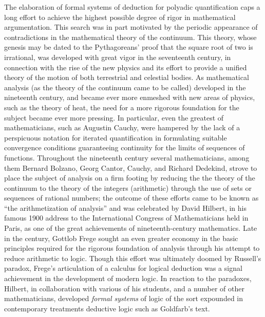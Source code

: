 The elaboration of formal systems of deduction for polyadic quantification caps a long effort to achieve the highest possible degree of rigor in mathematical argumentation. This search was in part motivated by the periodic appearance of contradictions in the mathematical theory of the continuum. This theory, whose genesis may be dated to the Pythagoreans' proof that the square root of two is irrational, was developed with great vigor in the seventeenth century, in connection with the rise of the new physics and its effort to provide a unified theory of the motion of both terrestrial and celestial bodies. As mathematical analysis (as the theory of the continuum came to be called) developed in the nineteenth century, and became ever more enmeshed with new areas of physics, such as the theory of heat, the need for a more rigorous foundation for the subject became ever more pressing. In particular, even the greatest of mathematicians, such as Augustin Cauchy, were hampered by the lack of a perspicuous notation for iterated quantification in formulating suitable convergence conditions guaranteeing continuity for the limits of sequences of functions. Throughout the nineteenth century several mathematicians, among them Bernard Bolzano, Georg Cantor, Cauchy, and Richard Dedekind, strove to place the subject of analysis on a firm footing by reducing the the theory of the continuum to the theory of the integers (arithmetic) through the use of sets or sequences of rational numbers; the outcome of these efforts came to be known as ``the arithmetization of analysis'' and was celebrated by David Hilbert, in his famous 1900 address to the International Congress of Mathematicians held in Paris, as one of the great achievements of nineteenth-century mathematics. Late in the century, Gottlob Frege sought an even greater economy in the basic principles required for the rigorous foundation of analysis through his attempt to reduce arithmetic to logic. Though this effort was ultimately doomed by Russell's paradox, Frege's articulation of a calculus for logical deduction was a signal achievement in the development of modern logic. In reaction to the paradoxes, Hilbert, in collaboration with various of his students, and a number of other mathematicians, developed \emph{formal systems} of logic of the sort expounded in contemporary treatments deductive logic such as Goldfarb's text. 


